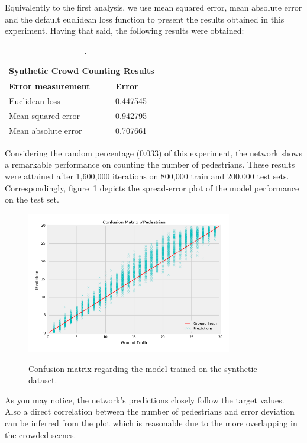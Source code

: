 Equivalently to the first analysis, we use mean squared error, mean absolute error and the default euclidean loss function to present the results obtained in this experiment. Having that said, the following results were obtained:

\begin{table}[H]
\centering
\small\sffamily
\begin{tabular}{llr}
\multicolumn{2}{c}{\textbf{\textbf{Synthetic Crowd Counting Results}}} \\
\bottomrule
\textbf{Error measurement}        & \textbf{Error} \\
\bottomrule
Euclidean loss           & 0.447545  \\
Mean squared error       & 0.942795  \\
Mean absolute error      & 0.707661  \\
\bottomrule
\end{tabular}
\caption{.}
\label{tab:res}
\end{table} 

Considering the random percentage (0.033) of this experiment, the network shows a remarkable performance on counting the number of pedestrians. These results were attained after 1,600,000 iterations on 800,000 train and 200,000 test sets. Correspondingly, figure~\ref{fig:splot} depicts the spread-error plot of the model performance on the test set.

\begin{figure}[H]
	\centering
	{\includegraphics[width=0.8\textwidth]{images/syntheticGraph}}
	\caption{Confusion matrix regarding the model trained on the synthetic dataset.}
	\label{fig:splot}
\end{figure}

As you may notice, the network's predictions closely follow the target values. Also a direct correlation between the number of pedestrians and error deviation can be inferred from the plot which is reasonable due to the more overlapping in the crowded scenes. 

